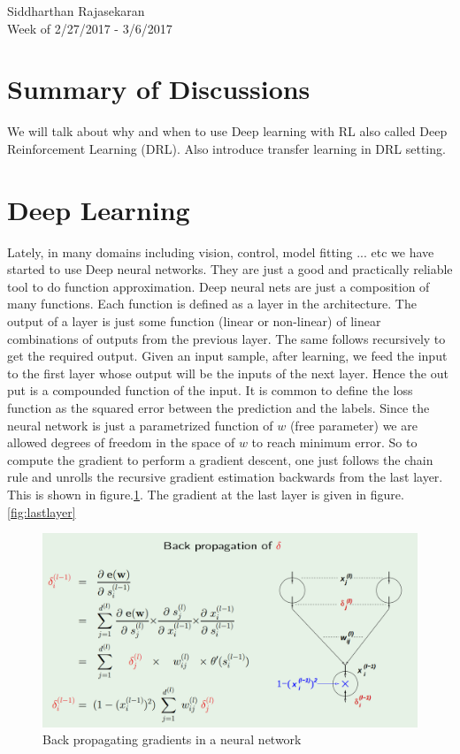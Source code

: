 \documentclass{article}[11pt]
\begin{document}
\begin{center}
Siddharthan Rajasekaran\\
Week of 2/27/2017 - 3/6/2017
\end{center}

\section{Summary of Discussions}
We will talk about why and when to use Deep learning with RL also called Deep Reinforcement Learning (DRL). Also introduce transfer learning in DRL setting.

\section{Deep Learning}
Lately, in many domains including vision, control, model fitting ... etc we have started to use Deep neural networks. They are just a good and practically reliable tool to do function approximation. Deep neural nets are just a composition of many functions. Each function is defined as a layer in the architecture. The output of a layer is just some function (linear or non-linear) of linear combinations of outputs from the previous layer. The same follows recursively to get the required output. Given an input sample, after learning, we feed the input to the first layer whose output will be the inputs of the next layer. Hence the out put is a compounded function of the input. It is common to define the loss function as the squared error between the prediction and the labels. Since the neural network is just a parametrized function of $w$ (free parameter) we are allowed degrees of freedom in the space of $w$ to reach minimum error. So to compute the gradient to perform a gradient descent, one just follows the chain rule and unrolls the recursive gradient estimation backwards from the last layer. This is shown in figure.\ref{fig:backprop}. The gradient at the last layer is given in figure.\ref{fig:lastlayer}

\begin{figure}[H]
  \begin{center}
    \includegraphics[width=1\linewidth]{images/backprop}
    \caption{Back propagating gradients in a neural network}
    \label{fig:backprop}
  \end{center}
\end{figure}
\end{document}
